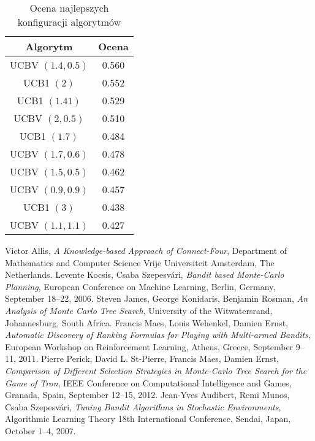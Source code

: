 \documentclass[a4paper,12pt]{article}
\begin{document}
\begin{table}[!h]
	\centering
	\begin{tabular}{|c|c|} \hline
		Algorytm & Ocena \\ \hline
		UCBV $(1.4, 0.5)$ &	0.560 \\ \hline
		UCB1 $(2)$ &	0.552 \\ \hline
		UCB1 $(1.41)$ &	0.529 \\ \hline
		UCBV $(2, 0.5)$ &	0.510 \\ \hline
		UCB1 $(1.7)$ &	0.484 \\ \hline
		UCBV $(1.7, 0.6)$ &	0.478 \\ \hline
		UCBV $(1.5, 0.5)$ &	0.462 \\ \hline
		UCBV $(0.9, 0.9)$ &	0.457 \\ \hline
		UCB1 $(3)$ &	0.438 \\ \hline
		UCBV $(1.1, 1.1)$ &	0.427 \\ \hline
	\end{tabular}
	\caption{Ocena najlepszych konfiguracji algorytmów}
	\label{tab:all_params}
\end{table}

\begin{thebibliography}{20}
	 Victor Allis, \emph{A Knowledge-based Approach of Connect-Four}, Department of Mathematics and Computer Science Vrije Universiteit Amsterdam, The Netherlands. %
	 Levente Kocsis, Csaba Szepesvári, \emph{Bandit based Monte-Carlo Planning}, European Conference on Machine Learning, Berlin, Germany, September 18--22, 2006.
	 Steven James, George Konidaris, Benjamin Rosman, \emph{An Analysis of Monte Carlo Tree Search}, University of the Witwatersrand, Johannesburg, South Africa.
	 Francis Maes, Louis Wehenkel, Damien Ernst, \emph{Automatic Discovery of Ranking Formulas for Playing with Multi-armed Bandits}, European Workshop on Reinforcement Learning, Athens, Greece, September 9--11, 2011.
	 Pierre Perick, David L. St-Pierre, Francis Maes, Damien Ernst, \emph{Comparison of Different Selection Strategies in Monte-Carlo Tree Search for the Game of Tron},  IEEE Conference on Computational Intelligence and Games, Granada, Spain, September 12--15, 2012. %
	 Jean-Yves Audibert, Remi Munos, Csaba Szepesvári, \emph{Tuning Bandit Algorithms in Stochastic Environments}, Algorithmic Learning Theory 18th International Conference, Sendai, Japan, October 1--4, 2007. %
\end{thebibliography}
\end{document}
